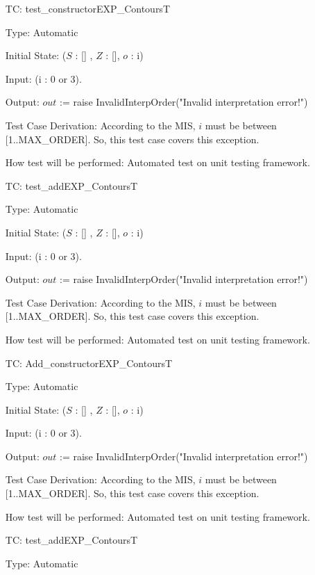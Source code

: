 \documentclass[12pt]{article}
\newcounter{utestnum} %
\begin{document}
\begin{enumerate}[label=TC\arabic*:,ref={\arabic*}]
\item [TC\refstepcounter{utestnum}\theutestnum: \label{ConstructorEXPContoursTest}] 
test\_constructorEXP\_ContoursT

Type: Automatic

Initial State: ($S$ : [] , $Z$ : [], $o$ : i)

Input: (i : 0 or 3).

Output: $out$ := raise InvalidInterpOrder("Invalid interpretation error!")


Test Case Derivation: According to the MIS, $i$ must be between [1..\mbox{MAX\_ORDER}]. So, this test case covers this exception.

How test will be performed: Automated test on unit testing framework.

\item [TC\refstepcounter{utestnum}\theutestnum: \label{addEXPContoursTest}] 
test\_addEXP\_ContoursT

Type: Automatic

Initial State: ($S$ : [] , $Z$ : [], $o$ : i)

Input: (i : 0 or 3).

Output: $out$ := raise InvalidInterpOrder("Invalid interpretation error!")


Test Case Derivation: According to the MIS, $i$ must be between [1..\mbox{MAX\_ORDER}]. So, this test case covers this exception.

How test will be performed: Automated test on unit testing framework.

\item [TC\refstepcounter{utestnum}\theutestnum: \label{AddEXPContoursTest}] 
Add\_constructorEXP\_ContoursT

Type: Automatic

Initial State: ($S$ : [] , $Z$ : [], $o$ : i)

Input: (i : 0 or 3).

Output: $out$ := raise InvalidInterpOrder("Invalid interpretation error!")


Test Case Derivation: According to the MIS, $i$ must be between [1..\mbox{MAX\_ORDER}]. So, this test case covers this exception.

How test will be performed: Automated test on unit testing framework.

\item [TC\refstepcounter{utestnum}\theutestnum: \label{addEXPContoursTest}] 
test\_addEXP\_ContoursT

Type: Automatic


\end{enumerate}
\end{document}
